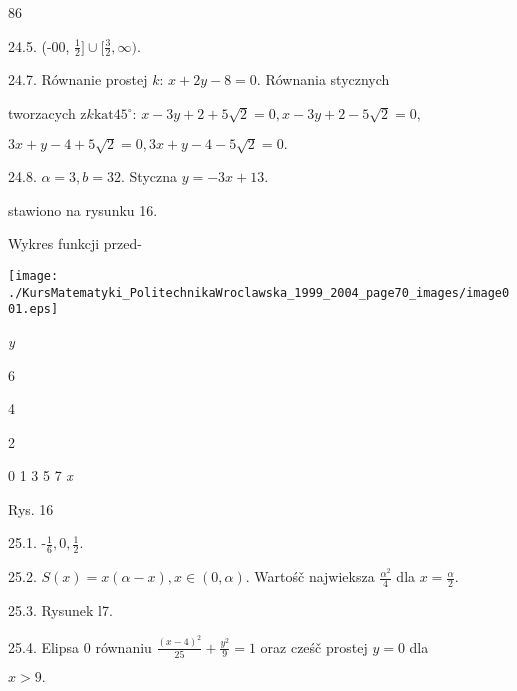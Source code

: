 \documentclass[a4paper,12pt]{article}
\begin{document}
86

24.5. (-00, $\displaystyle \frac{1}{2}]\cup[\frac{3}{2},\infty).$

24.7. Równanie prostej $k$: $x+2y-8 = 0$. Równania stycznych

tworzacych $\mathrm{z} k \mathrm{k}\mathrm{a}\mathrm{t} 45^{\circ}$: $x-3y+2+5\sqrt{2}= 0, x-3y+2-5\sqrt{2}= 0,$

$3x+y-4+5\sqrt{2}=0, 3x+y-4-5\sqrt{2}=0.$

24.8. $\alpha=3, b=32$. Styczna $y= -3x+13.$

stawiono na rysunku 16.

Wykres funkcji przed-
\begin{center}
\texttt{[image: ./KursMatematyki\_PolitechnikaWroclawska\_1999\_2004\_page70\_images/image001.eps]}
\end{center}
{\it y}

6

4

2

0 1  3 5  7  {\it x}

Rys. 16

25.1. -$\displaystyle \frac{1}{6}, 0, \displaystyle \frac{1}{2}.$

25.2. $S(x)=x(\alpha-x), x\in(0,\alpha)$. Wartośč najwieksza $\displaystyle \frac{\alpha^{2}}{4}$ dla $x=\displaystyle \frac{\alpha}{2}.$

25.3. Rysunek l7.

25.4. Elipsa $0$ równaniu $\displaystyle \frac{(x-4)^{2}}{25}+\frac{y^{2}}{9}=1$ oraz cześč prostej $y=0$ dla

$x>9.$
\end{document}
